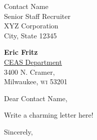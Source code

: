 \documentclass[11pt]{letter}
\def\contactname{Contact Name}
\def\contactaddress{Senior Staff Recruiter \\ XYZ Corporation \\ City, State 12345}
\begin{document}
\begin{letter}{\contactname \\ \contactaddress}

\begin{center}
	{\large\bf Eric Fritz} \\ 
	\href{http://www4.uwm.edu/ceas/cs/}{CEAS Department} \\ 3400 N. Cramer, \\ \vspace{-0.05in} Milwaukee, \textsc{wi} 53201
\end{center} \vfill

\opening{Dear \contactname,}

\noindent Write a charming letter here!  

\closing{Sincerely,}

\end{letter}
\end{document}
